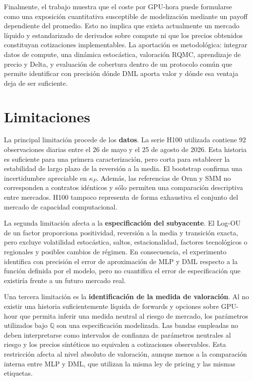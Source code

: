 Finalmente, el trabajo muestra que el coste por GPU-hora puede formularse como una exposición cuantitativa susceptible de modelización mediante un payoff dependiente del promedio. Esto no implica que exista actualmente un mercado líquido y estandarizado de derivados sobre compute ni que los precios obtenidos constituyan cotizaciones implementables. La aportación es metodológica: integrar datos de compute, una dinámica estocástica, valoración RQMC, aprendizaje de precio y Delta, y evaluación de cobertura dentro de un protocolo común que permite identificar con precisión dónde DML aporta valor y dónde esa ventaja deja de ser suficiente.

\section{Limitaciones}
\label{sec:limitaciones}

La principal limitación procede de los \textbf{datos}. La serie H100 utilizada contiene $92$ observaciones diarias entre el 26 de mayo y el 25 de agosto de 2026. Esta historia es suficiente para una primera caracterización, pero corta para establecer la estabilidad de largo plazo de la reversión a la media. El bootstrap confirma una incertidumbre apreciable en $\kappa_P$. Además, las referencias de Ornn y SMM no corresponden a contratos idénticos y sólo permiten una comparación descriptiva entre mercados. H100 tampoco representa de forma exhaustiva el conjunto del mercado de capacidad computacional.

La segunda limitación afecta a la \textbf{especificación del subyacente}. El Log-OU de un factor proporciona positividad, reversión a la media y transición exacta, pero excluye volatilidad estocástica, saltos, estacionalidad, factores tecnológicos o regionales y posibles cambios de régimen. En consecuencia, el experimento identifica con precisión el error de aproximación de MLP y DML respecto a la función definida por el modelo, pero no cuantifica el error de especificación que existiría frente a un futuro mercado real.

Una tercera limitación es la \textbf{identificación de la medida de valoración}. Al no existir una historia suficientemente líquida de forwards y opciones sobre GPU-hour que permita inferir una medida neutral al riesgo de mercado, los parámetros utilizados bajo $\mathbb Q$ son una especificación modelizada. Las bandas empleadas no deben interpretarse como intervalos de confianza de parámetros neutrales al riesgo y los precios sintéticos no equivalen a cotizaciones observables. Esta restricción afecta al nivel absoluto de valoración, aunque menos a la comparación interna entre MLP y DML, que utilizan la misma ley de pricing y las mismas etiquetas.

